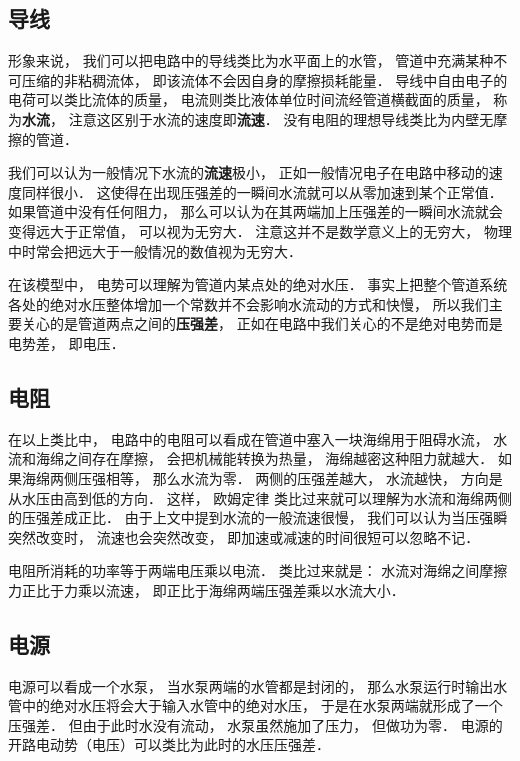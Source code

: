 
\begin{issues}
\issueDraft
\end{issues}

\subsection{导线}
形象来说， 我们可以把电路中的导线类比为水平面上的水管， 管道中充满某种不可压缩的非粘稠流体， 即该流体不会因自身的摩擦损耗能量． 导线中自由电子的电荷可以类比流体的质量， 电流则类比液体单位时间流经管道横截面的质量， 称为\textbf{水流}， 注意这区别于水流的速度即\textbf{流速}． 没有电阻的理想导线类比为内壁无摩擦的管道．

我们可以认为一般情况下水流的\textbf{流速}极小， 正如一般情况电子在电路中移动的速度同样很小． 这使得在出现压强差的一瞬间水流就可以从零加速到某个正常值． 如果管道中没有任何阻力， 那么可以认为在其两端加上压强差的一瞬间水流就会变得远大于正常值， 可以视为无穷大． 注意这并不是数学意义上的无穷大， 物理中时常会把远大于一般情况的数值视为无穷大．

在该模型中， 电势可以理解为管道内某点处的绝对水压． 事实上把整个管道系统各处的绝对水压整体增加一个常数并不会影响水流动的方式和快慢， 所以我们主要关心的是管道两点之间的\textbf{压强差}， 正如在电路中我们关心的不是绝对电势而是电势差， 即电压．

\subsection{电阻}
在以上类比中， 电路中的电阻可以看成在管道中塞入一块海绵用于阻碍水流， 水流和海绵之间存在摩擦， 会把机械能转换为热量， 海绵越密这种阻力就越大． 如果海绵两侧压强相等， 那么水流为零． 两侧的压强差越大， 水流越快， 方向是从水压由高到低的方向． 这样， 欧姆定律 类比过来就可以理解为水流和海绵两侧的压强差成正比． 由于上文中提到水流的一般流速很慢， 我们可以认为当压强瞬突然改变时， 流速也会突然改变， 即加速或减速的时间很短可以忽略不记．

电阻所消耗的功率等于两端电压乘以电流． 类比过来就是： 水流对海绵之间摩擦力正比于力乘以流速， 即正比于海绵两端压强差乘以水流大小．

\subsection{电源}
电源可以看成一个水泵， 当水泵两端的水管都是封闭的， 那么水泵运行时输出水管中的绝对水压将会大于输入水管中的绝对水压， 于是在水泵两端就形成了一个压强差． 但由于此时水没有流动， 水泵虽然施加了压力， 但做功为零． 电源的开路电动势（电压）可以类比为此时的水压压强差．

